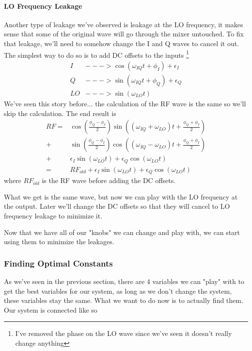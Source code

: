 \paragraph*{LO Frequency Leakage}
Another type of leakage we've observed is leakage at the LO frequency, it makes sense that some of the original wave will go through the mixer untouched. To fix that leakage, we'll need to somehow change the I and Q waves to cancel it out. The simplest way to do so is to add DC offsets to the inputs \footnote{I've removed the phase on the LO wave since we've seen it doesn't really change anything}
\begin{align*}
    I &---> \cos (\omega_{IQ} t + \phi_I) + \epsilon_I\\
    Q &---> \sin (\omega_{IQ} t + \phi_Q) + \epsilon_Q\\
    LO &---> \sin (\omega_{LO}t)
\end{align*}
We've seen this story before... the calculation of the RF wave is the same so we'll skip the calculation. The end result is
\begin{align*}
RF = &\cos (\frac{\phi_Q - \phi_I}{2})\sin ( (\omega_{IQ} + \omega_{LO})t + \frac{\phi_Q + \phi_I}{2}) \\
   + &\sin (\frac{\phi_Q - \phi_I}{2})\cos ( (\omega_{IQ} - \omega_{LO})t + \frac{\phi_Q + \phi_I}{2}) \\
   + &\epsilon_I  \sin (\omega_{LO}t) + \epsilon_Q  \cos (\omega_{LO}t) \\
   = &RF_{old} + \epsilon_I  \sin (\omega_{LO}t) + \epsilon_Q  \cos (\omega_{LO}t)
\end{align*}
where $RF_{old}$ is the RF wave before adding the DC offsets. 

What we get is the same wave, but now we can play with the LO frequency at the output. Later we'll change the DC offsets so that they will cancel to LO frequency leakage to minimize it.

Now that we have all of our "knobs" we can change and play with, we can start using them to minimize the leakages.


\subsubsection{Finding Optimal Constants} %
As we've seen in the previous section, there are 4 variables we can "play" with to get the best variables for our system, as long as we don't change the system, these variables stay the same. What we want to do now is to actually find them. Our system is connected like so

